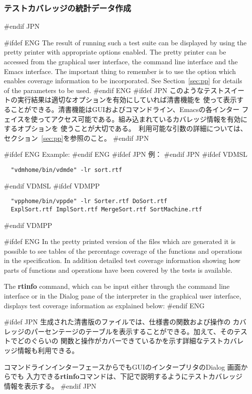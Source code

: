 \documentclass[\pformat,12pt]{article}
\newcommand{\guicmd}[1]{{\sf #1}}
\newcommand{\guicmd}[1]{{\gt #1}}
\begin{document}
\subsubsection{テストカバレッジの統計データ作成}
#endif JPN

#ifdef ENG
The result of running such a test suite can be displayed by using the
pretty printer with appropriate options enabled.  The pretty printer
can be accessed from the graphical user interface, the command
line interface and the Emacs interface. The important thing to
remember is to use the option which enables coverage information to be
incorporated. See Section~\ref{sec:pp} for details of the
parameters to be used.
#endif ENG
#ifdef JPN
このようなテストスイートの実行結果は適切なオプションを有効にしていれば清書機能を
使って表示することができる。清書機能はGUIおよびコマンドライン、Emacsの各インター
フェイスを使ってアクセス可能である。組み込まれているカバレッジ情報を有効にするオプションを
使うことが大切である。　利用可能な引数の詳細については、セクション~\ref{sec:pp}を参照のこと。
#endif JPN

#ifdef ENG
Example:
#endif ENG
#ifdef JPN
例：
#endif JPN
#ifdef VDMSL
\begin{verbatim}
  "vdmhome/bin/vdmde" -lr sort.rtf
\end{verbatim}
#endif VDMSL
#ifdef VDMPP
\begin{verbatim}
  "vpphome/bin/vppde" -lr Sorter.rtf DoSort.rtf
  ExplSort.rtf ImplSort.rtf MergeSort.rtf SortMachine.rtf
\end{verbatim}
#endif VDMPP

#ifdef ENG
In the pretty printed version of the files which are generated it is
possible to see tables of the percentage coverage of the functions
and operations in the specification. In addition detailed test
coverage information showing how parts of functions and operations
have been covered by the tests is available.

The \textbf{rtinfo} command, which can be input either through the command
line interface or in the \guicmd{Dialog} pane of the interpreter in  the
graphical user interface, displays test coverage information as
explained below:
#endif ENG

#ifdef JPN
生成された清書版のファイルでは、仕様書の関数および操作の
カバレッジのパーセンテージのテーブルを表示することができる。加えて、そのテストでどのぐらいの
関数と操作がカバーできているかを示す詳細なテストカバレッジ情報も利用できる。

コマンドラインインターフェースからでもGUIのインタープリタの\guicmd{Dialog} 画面からでも
入力できる\textbf{rtinfo}コマンドは、下記で説明するようにテストカバレッジ情報を表示する。
#endif JPN
\end{document}
